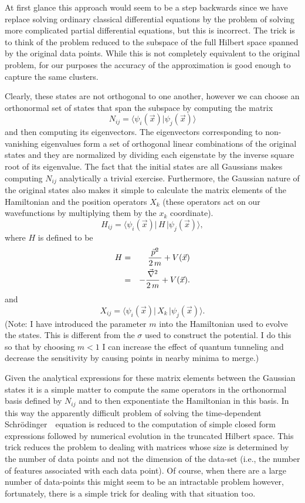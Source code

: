 \documentclass[fleqn,twoside]{article}
\def\be{\begin{equation}}
\def\ee{\end{equation}}
\newcommand{\ba}{\begin{eqnarray}}
\newcommand{\ea}{\end{eqnarray}}
\def\ket#1{\vert #1 \rangle}
\def\bra#1{\langle #1 \vert}
\def\bracket#1#2{\langle #1 \vert #2 \rangle}
\newcommand{\Schrodinger}{Schr\"odinger\ }
\begin{document}
At first glance this approach would seem to be a step backwards
since we have replace solving ordinary classical differential
equations by the problem of solving more complicated partial differential equations,
but this is incorrect.  The trick is to think
of the problem reduced to the subspace of the full Hilbert
space spanned by the original data points.  While this is not
completely equivalent to the original problem, for our purposes
the accuracy of the approximation is good enough to capture
the same clusters.

Clearly, these states
are not orthogonal to one another, however we can choose an orthonormal
set of states that span the subspace by computing the matrix
\be
    N_{ij} = \bracket{\psi_i(\vec{x})}{\psi_j(\vec{x})}
\ee
and then computing its eigenvectors.  The eigenvectors corresponding
to non-vanishing eigenvalues form a set of orthogonal linear
combinations of the original states and they are normalized by
dividing each eigenstate by the inverse square root of its
eigenvalue.  The fact that the initial states are all Gaussians
makes computing $N_{ij}$ analytically a trivial exercise.
Furthermore, the Gaussian nature of the original states also
makes it simple to calculate the matrix elements of the Hamiltonian
and the position operators $X_k$ (these operators act on our
wavefunctions by multiplying them by the $x_k$ coordinate).
\be
    H_{ij} = \bra{\psi_i(\vec{x})}\,H\,\ket{\psi_j(\vec{x})},
\ee
where $H$ is defined to be
\ba
    H &=& {\vec{p}^2 \over 2\,m} + V(\vec{x}) \nonumber\\
      &=& -{\vec{\nabla}^2 \over 2\,m} + V(\vec{x}).
\ea
and
\be
   X_{ij} = \bra{\psi_i(\vec{x})}\,X_k\,\ket{\psi_j(\vec{x})}.
\ee
(Note: I have introduced the parameter $m$ into the Hamiltonian
used to evolve the states.  This is different from the $\sigma$
used to construct the potential.  I do this so that by
choosing $m < 1$ I can increase the effect of quantum tunneling
and decrease the sensitivity by causing points in nearby
minima to merge.)

Given the analytical expressions for these matrix elements
between the Gaussian states it is a simple matter to compute
the same operators in the orthonormal basis defined by $N_{ij}$ and
to then exponentiate the Hamiltonian in this basis.  In this way
the apparently difficult problem of solving the time-dependent
\Schrodinger\ equation is reduced to the computation of
simple closed form expressions followed by numerical evolution
in the truncated Hilbert space.  This trick reduces the problem
to dealing with matrices whose size is determined by the number
of data points and not the dimension of the data-set (i.e., the number
of features associated with each data point).  Of course, when
there are a large number of data-points this might seem to be
an intractable problem however, fortunately, there is a
simple trick for dealing with that situation too.
\end{document}
